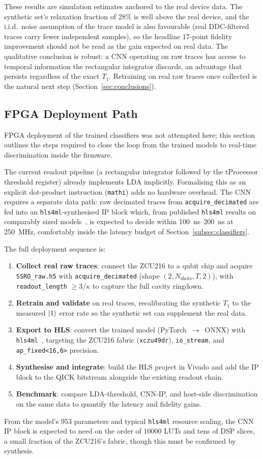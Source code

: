 These results are simulation estimates anchored to the real device data.  The
synthetic set's relaxation fraction of 28\% is well above the real device, and the
i.i.d.\ noise assumption of the trace model is also favourable (real DDC-filtered
traces carry fewer independent samples), so the headline
17-point fidelity improvement should not be read as the gain expected on real data.
The qualitative conclusion is robust: a CNN operating on raw
traces has access to temporal information the rectangular integrator discards, an
advantage that persists regardless of the exact $T_1$.  Retraining on
real raw traces once collected is the natural
next step (Section~\ref{sec:conclusions}).

\subsection{FPGA Deployment Path}
\label{subsec:deployment_path}

FPGA deployment of the trained classifiers was not attempted here; this section
outlines the steps required to close the loop
from the trained models to real-time discrimination inside the \QICK{} firmware.

The current readout pipeline (a rectangular integrator followed by the tProcessor
threshold register) already implements LDA implicitly.  Formalising this as an
explicit dot-product instruction (\texttt{mathi}) adds no hardware overhead.  The
CNN requires a separate data path: raw decimated traces from
\texttt{acquire\_decimated} are fed into an \texttt{hls4ml}-synthesised IP block
which, from published \texttt{hls4ml} results on comparably sized
models~\cite{Fahim2021}, is expected to decide within
\SIrange{100}{200}{\nano\second} at \SI{250}{\mega\hertz}, comfortably inside the
latency budget of Section~\ref{subsec:classifiers}.

The full deployment sequence is:
\begin{enumerate}
  \item \textbf{Collect real raw traces}: connect the ZCU216 to a qubit chip and
        acquire \texttt{SSRO\_raw.h5} with \texttt{acquire\_decimated} (shape
        $(2, N_\text{shots}, T, 2)$), with \texttt{readout\_length} $\geq 3/\kappa$
        to capture the full cavity ringdown.
  \item \textbf{Retrain and validate} on real traces, recalibrating the
        synthetic $T_1$ to the measured $\ket{1}$ error rate so the synthetic set
        can supplement the real data.
  \item \textbf{Export to HLS}: convert the trained model (PyTorch~$\to$~ONNX) with
        \texttt{hls4ml}~\cite{Fahim2021}, targeting the ZCU216 fabric
        (\texttt{xczu49dr}), \texttt{io\_stream}, and \texttt{ap\_fixed<16,6>}
        precision.
  \item \textbf{Synthesise and integrate}: build the HLS project in Vivado and add
        the IP block to the QICK bitstream alongside the existing readout chain.
  \item \textbf{Benchmark}: compare LDA-threshold, CNN-IP, and host-side
        discrimination on the same data to quantify the latency and fidelity gains.
\end{enumerate}

From the model's 953 parameters and typical \texttt{hls4ml} resource scaling,
the CNN IP block is expected to need on the order
of \num{10000} LUTs and tens of DSP slices, a small fraction of the ZCU216's
fabric, though this must be confirmed by synthesis.
